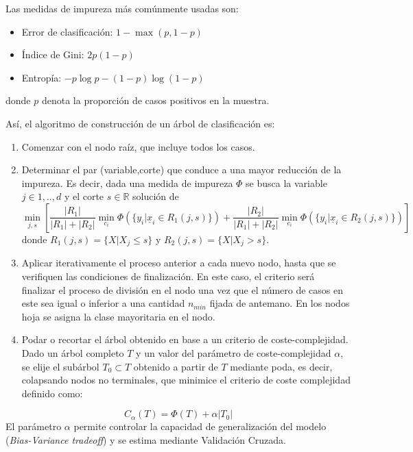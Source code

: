 \documentclass[12pt,a4paper,]{book}
\numberwithin{dummy}{section}
\theoremstyle{ocrenumbox}
\theoremstyle{blacknumex}
\theoremstyle{blacknumbox}
\theoremstyle{ocrenum}
\theoremstyle{ocrenum}
\begin{document}
Las medidas de impureza más comúnmente usadas son:

\begin{itemize}
\item
  Error de clasificación: \(1 - \max(p,1-p)\)
\item
  Índice de Gini: \(2p(1-p)\)
\item
  Entropía: \(-p \log p - (1 - p) \log (1 - p)\)
\end{itemize}

donde \(p\) denota la proporción de casos positivos en la muestra.

Así, el algoritmo de construcción de un árbol de clasificación es:

\begin{enumerate}
\def\labelenumi{\arabic{enumi}.}
\item
  Comenzar con el nodo raíz, que incluye todos los casos.
\item
  Determinar el par (variable,corte) que conduce a una mayor reducción
  de la impureza. Es decir, dada una medida de impureza \(\Phi\) se
  busca la variable \(j \in {1,..,d}\) y el corte \(s \in \mathbb{R}\)
  solución de \[\min_{j,s}\left[ 
  \frac{|R_1|}{|R_1|+|R_2|}\min_{c_i} \Phi \left(\{y_i |\underline x_i \in R_1(j,s)\} \right)  + 
  \frac{|R_2|}{|R_1|+|R_2|}\min_{c_i} \Phi \left(\{y_i |\underline x_i \in R_2(j,s)\} \right)\right]\]
  donde \(R_1(j,s) = \{X | X_j \le s \}\) y
  \(R_2(j,s) = \{X | X_j > s \}\).
\item
  Aplicar iterativamente el proceso anterior a cada nuevo nodo, hasta
  que se verifiquen las condiciones de finalización. En este caso, el
  criterio será finalizar el proceso de división en el nodo una vez que
  el número de casos en este sea igual o inferior a una cantidad
  \(n_{min}\) fijada de antemano. En los nodos hoja se asigna la clase
  mayoritaria en el nodo.
\item
  Podar o recortar el árbol obtenido en base a un criterio de
  coste-complejidad. Dado un árbol completo \(T\) y un valor del
  parámetro de coste-complejidad \(\alpha\), se elije el subárbol
  \(T_0 \subset T\) obtenido a partir de \(T\) mediante poda, es decir,
  colapsando nodos no terminales, que minimice el criterio de coste
  complejidad definido como:
\end{enumerate}

\[C_{\alpha}(T) = \Phi(T) + \alpha|T_0|\] El parámetro \(\alpha\)
permite controlar la capacidad de generalización del modelo
(\emph{Bias-Variance tradeoff}) y se estima mediante Validación Cruzada.
\end{document}
